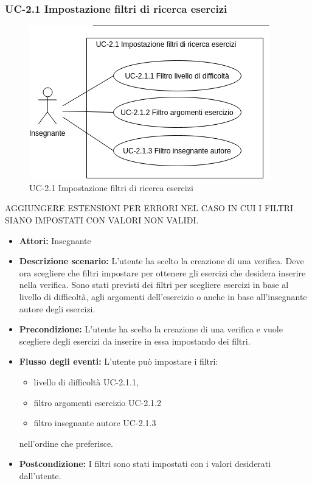 \subsubsection{UC-2.1 Impostazione filtri di ricerca esercizi}

\begin{figure}[htbp]
	\centering
	\includegraphics[scale=0.7]{images/UC-2_1.png}
	\caption{UC-2.1 Impostazione filtri di ricerca esercizi}
\end{figure}
AGGIUNGERE ESTENSIONI PER ERRORI NEL CASO IN CUI I FILTRI SIANO IMPOSTATI CON VALORI NON VALIDI.
\begin{itemize}
		\item \textbf{Attori: } Insegnante
		\item \textbf{Descrizione scenario: }L'utente ha scelto la creazione di una verifica. Deve ora scegliere che filtri impostare per ottenere gli esercizi che desidera inserire nella verifica. Sono stati previsti dei filtri per scegliere esercizi in base al livello di difficoltà, agli argomenti dell'esercizio o anche in base all'insegnante autore degli esercizi.
		\item \textbf{Precondizione: }L'utente ha scelto la creazione di una verifica e vuole scegliere degli esercizi da inserire in essa impostando dei filtri.
		\item \textbf{Flusso degli eventi: }L'utente può impostare i filtri:
		\begin{itemize}
		\item livello di difficoltà UC-2.1.1, 
		\item filtro argomenti esercizio UC-2.1.2
		\item filtro insegnante autore UC-2.1.3
		\end{itemize}	
		nell'ordine che preferisce.	
		\item \textbf{Postcondizione: }I filtri sono stati impostati con i valori desiderati dall'utente.
\end{itemize}
